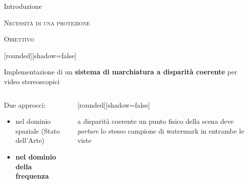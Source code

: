 \documentclass{beamer}
\begin{document}
\begin{section}{Introduzione}
\begin{frame}[t]{\textsc{Necessit\`{a} di una protezione}}
\end{frame}







\begin{frame}[t]{\textsc{Obiettivo}}
\vspace{0.5em}
\begin{center}
 [rounded][shadow=false]
 \begin{block}{}
 \center \large{Implementazione di un \textbf{sistema di marchiatura a disparit\`{a} coerente} per video stereoscopici}
 \end{block}
\end{center}
\begin{columns}[T]
\begin{column}[T]{5cm}
Due approcci:
\vspace{0.2em}
\begin{itemize}
\item nel dominio spaziale (Stato dell'Arte)\\
\item \textbf{nel dominio della frequenza} 
\end{itemize}
\end{column}
\begin{column}[T]{5cm}
\vspace{0.2em}	
[rounded][shadow=false]
\begin{block}{\small{a disparit\`{a} coerente}}
\center \small{un punto fisico della scena deve \textit{portare} lo stesso campione di watermark in entrambe le viste}
\end{block}
\end{column}
\end{columns}


\end{frame}




\end{section}
\end{document}
